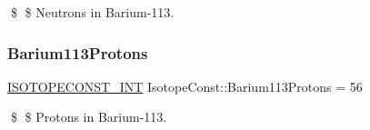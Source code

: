 \$ \$ Neutrons in Barium-\/113. \mbox{\label{group___isotope_const-_barium-_ba113_gacc481e2f9abe76df235ee0e1ae7c4df7}} 
\subsubsection{\texorpdfstring{Barium113\+Protons}{Barium113Protons}}
{\footnotesize\ttfamily \mbox{\hyperlink{group___isotope_const-_macros_ga5f18360b3e99483a35c32d789e62621c}{I\+S\+O\+T\+O\+P\+E\+C\+O\+N\+S\+T\+\_\+\+I\+NT}} Isotope\+Const\+::\+Barium113\+Protons = 56}

\$ \$ Protons in Barium-\/113. 